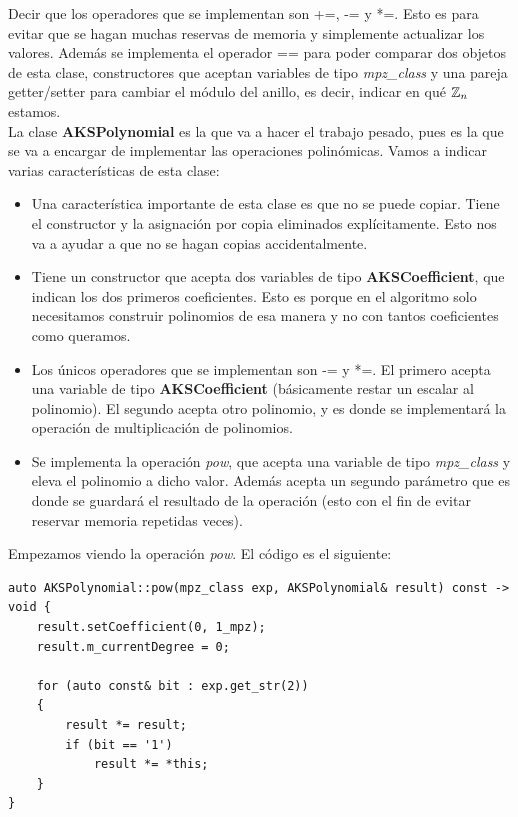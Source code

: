 Decir que los operadores que se implementan son +=, -= y *=. Esto es para evitar que se hagan muchas reservas de memoria y simplemente actualizar los valores. Además se implementa el operador == para poder comparar dos objetos de esta clase, constructores que aceptan variables de tipo \textit{mpz\_class} y una pareja getter/setter para cambiar el módulo del anillo, es decir, indicar en qué $\mathbb{Z}_n$ estamos.\\

La clase \textbf{AKSPolynomial} es la que va a hacer el trabajo pesado, pues es la que se va a encargar de implementar las operaciones polinómicas. Vamos a indicar varias características de esta clase:

\begin{itemize}
	\item Una característica importante de esta clase es que no se puede copiar. Tiene el constructor y la asignación por copia eliminados explícitamente. Esto nos va a ayudar a que no se hagan copias accidentalmente.
	
	\item Tiene un constructor que acepta dos variables de tipo \textbf{AKSCoefficient}, que indican los dos primeros coeficientes. Esto es porque en el algoritmo solo necesitamos construir polinomios de esa manera y no con tantos coeficientes como queramos.
	
	\item Los únicos operadores que se implementan son -= y *=. El primero acepta una variable de tipo \textbf{AKSCoefficient} (básicamente restar un escalar al polinomio). El segundo acepta otro polinomio, y es donde se implementará la operación de multiplicación de polinomios.
	
	\item Se implementa la operación \textit{pow}, que acepta una variable de tipo \textit{mpz\_class} y eleva el polinomio a dicho valor. Además acepta un segundo parámetro que es donde se guardará el resultado de la operación (esto con el fin de evitar reservar memoria repetidas veces).
\end{itemize}

Empezamos viendo la operación \textit{pow}. El código es el siguiente:\\

\begin{lstlisting}
auto AKSPolynomial::pow(mpz_class exp, AKSPolynomial& result) const -> void {
	result.setCoefficient(0, 1_mpz);
	result.m_currentDegree = 0;
	
	for (auto const& bit : exp.get_str(2))
	{
		result *= result;
		if (bit == '1')
			result *= *this;
	}
}
\end{lstlisting}

